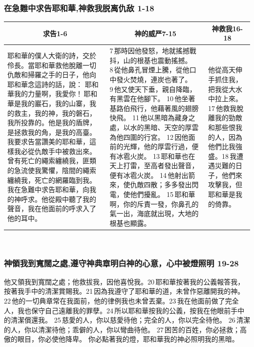 \subsubsection{在急難中求告耶和華,神救我脱离仇敌 1-18}
\begin{table}[H]
\centering
\begin{tabular}{p{7.25cm}|p{7.5cm}|p{2.5cm}}\hline\hline
\multicolumn{1}{c|}{求告1-6}&\multicolumn{1}{c|}{神的威严7-15}&\multicolumn{1}{c}{神救我16-18}\\\hline
耶和華的僕人大衛的詩，交於伶長。當耶和華救他脫離一切仇敵和掃羅之手的日子，他向耶和華念這詩的話，說：
耶和華我的力量啊，我愛你！ 耶和華是我的巖石，我的山寨，我的救主，我的神，我的磐石，我所投靠的。他是我的盾牌，是拯救我的角，是我的高臺。
我要求告當讚美的耶和華，這樣我必從仇敵手中被救出來。曾有死亡的繩索纏繞我，匪類的急流使我驚懼，陰間的繩索纏繞我，死亡的網羅臨到我。我在急難中求告耶和華，向我的神呼求。他從殿中聽了我的聲音，我在他面前的呼求入了他的耳中。
&7 那時因他發怒，地就搖撼戰抖，山的根基也震動搖撼。
8 從他鼻孔冒煙上騰，從他口中發火焚燒，連炭也著了。
9 他又使天下垂，親自降臨，有黑雲在他腳下。
10 他坐著基路伯飛行，他藉著風的翅膀快飛。
11 他以黑暗為藏身之處，以水的黑暗、天空的厚雲為他四圍的行宮。
12 因他面前的光輝，他的厚雲行過，便有冰雹火炭。
13 耶和華也在天上打雷，至高者發出聲音，便有冰雹火炭。
14 他射出箭來，使仇敵四散；多多發出閃電，使他們擾亂。
15 耶和華啊，你的斥責一發，你鼻孔的氣一出，海底就出現，大地的根基也顯露。
&他從高天伸手抓住我，把我從大水中拉上來。17 他救我脫離我的勁敵和那些恨我的人，因為他們比我強盛。18 我遭遇災難的日子，他們來攻擊我，但耶和華是我的倚靠。\\\hline
\end{tabular}
\end{table} 

\subsubsection{神領我到寬闊之處,遵守神典章明白神的心意，心中被燈照明 19-28}
他又領我到寬闊之處；他救拔我，因他喜悅我。20 耶和華按著我的公義報答我，按著我手中的清潔賞賜我。21 因為我遵守了耶和華的道，未曾作惡離開我的神。22 他的一切典章常在我面前，他的律例我也未曾丟棄。23 我在他面前做了完全人，我也保守自己遠離我的罪孽。24 所以耶和華按我的公義，按我在他眼前手中的清潔償還我。
25 慈愛的人，你以慈愛待他；完全的人，你以完全待他。
26 清潔的人，你以清潔待他；乖僻的人，你以彎曲待他。
27 困苦的百姓，你必拯救；高傲的眼目，你必使他降卑。
你必點著我的燈，耶和華我的神必照明我的黑暗。


